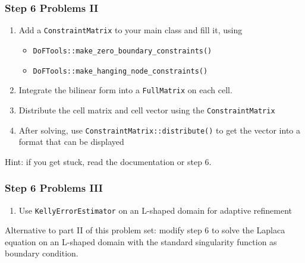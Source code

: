 \begin{frame}
  \frametitle{Step 6 Problems II}
  \begin{enumerate}
  \item Add a \lstinline!ConstraintMatrix! to your main class and fill it, using
    \begin{itemize}
    \item \lstinline!DoFTools::make_zero_boundary_constraints()!
    \item \lstinline!DoFTools::make_hanging_node_constraints()!
    \end{itemize}
  \item Integrate the bilinear form into a \lstinline!FullMatrix! on
    each cell.
  \item Distribute the cell matrix and cell vector using the
    \lstinline!ConstraintMatrix!
  \item After solving, use \lstinline!ConstraintMatrix::distribute()!
    to get the vector into a format that can be displayed
  \end{enumerate}
Hint: if you get stuck, read the documentation or step 6.
\end{frame}

\begin{frame}
  \frametitle{Step 6 Problems III}
  \begin{enumerate}
  \item Use \lstinline!KellyErrorEstimator! on an L-shaped domain for
    adaptive refinement
  \end{enumerate}

  Alternative to part II of this problem set: modify step 6 to solve
  the Laplaca equation on an L-shaped domain with the standard
  singularity function as boundary condition.
\end{frame}
